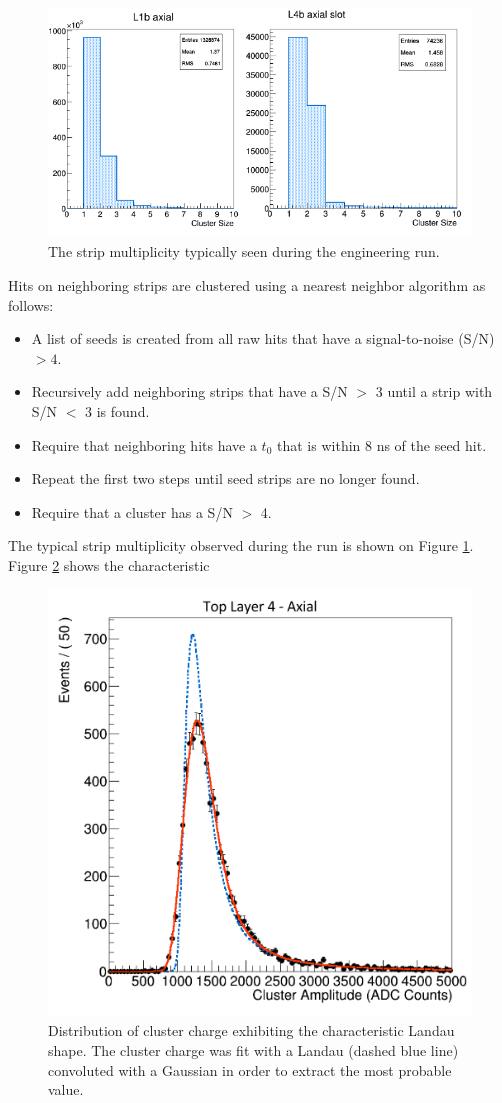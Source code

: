 \begin{figure}[h!t]
    \centering
    \includegraphics[width=\textwidth]{images/cluster_size.png}
    \caption{The strip multiplicity typically seen during the engineering run.}
    \label{fig:strip_mult}
\end{figure}  
Hits on neighboring strips are clustered using a nearest neighbor
algorithm as follows: 
\begin{itemize}
    \item A list of seeds is created from all raw hits that have a signal-to-noise (S/N)
          $>4$.
    \item Recursively add neighboring strips that have a S/N $>$ 3 until a strip with
          S/N $<$ 3 is found.
      \item Require that neighboring hits have a $t_{0}$ that is within 8 ns of the seed hit.
    \item Repeat the first two steps until seed strips are no longer found.
    \item Require that a cluster has a S/N $>$ 4.
\end{itemize}
The typical strip multiplicity observed during the run is shown on Figure 
\ref{fig:strip_mult}. Figure \ref{fig:cluster_charge} shows the characteristic
\begin{figure}[h!t]
    \centering
    \includegraphics[width=.7\textwidth]{images/top_layer4_axial_cluster_charge.png}
    \caption{Distribution of cluster charge exhibiting the characteristic Landau
    shape.  The cluster charge was fit with a Landau (dashed blue line) convoluted
    with a Gaussian in order to extract the most probable value.}
    \label{fig:cluster_charge}
\end{figure}  
